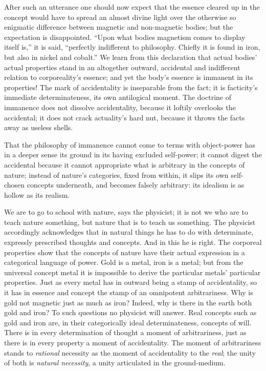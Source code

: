 \documentclass[12pt,a4paper]{book}
\begin{document}
After such an utterance one should now expect that the essence cleared up in the concept would have to spread an
almost divine light over the otherwise so enigmatic difference between magnetic and non-magnetic bodies; but the
expectation is disappointed. ``Upon what bodies magnetism comes to display itself is,'' it is said, ``perfectly
indifferent to philosophy. Chiefly it is found in iron, but also in nickel and cobalt.'' We learn from this
declaration that actual bodies' actual properties stand in an altogether outward, accidental and indifferent relation
to corporeality's essence; and yet the body's essence is immanent in its properties! The mark of accidentality is
inseparable from the fact; it is facticity's immediate determinateness, its own antilogical moment. The doctrine of
immanence does not dissolve accidentality, because it loftily overlooks the accidental; it does not crack
actuality's hard nut, because it throws the facts away as useless shells.

That the philosophy of immanence cannot come to terms with object-power has in a deeper sense its ground in its
having excluded self-power; it cannot digest the accidental because it cannot appropriate what is arbitrary in the
concepts of nature; instead of nature's categories, fixed from within, it slips its own self-chosen concepts
underneath, and becomes falsely arbitrary: its idealism is as hollow as its realism.

We are to go to school with nature, says the physicist; it is not we who are to teach nature something, but nature
that is to teach us something. The physicist accordingly acknowledges that in natural things he has to do with
determinate, expressly prescribed thoughts and concepts. And in this he is right. The corporeal properties show that
the concepts of nature
have their actual expression in a categorical language of power. Gold is a metal, iron is a metal; but from the
universal concept metal it is impossible to derive the particular metals' particular properties. Just as every metal
has in outward being a stamp of accidentality, so it has in essence and concept the stamp of an omnipotent
arbitrariness. Why is gold not magnetic just as much as iron? Indeed, why is there in the earth both gold and iron?
To such questions no physicist will answer. Real concepts such as gold and iron are, in their categorically ideal
determinateness, concepts of will. There is in every determination of thought a moment of arbitrariness, just as there
is in every property a moment of accidentality.
The moment of arbitrariness stands to \emph{rational} necessity as the moment of accidentality to the \emph{real};
the unity of both is \emph{natural necessity}, a unity articulated in the ground-medium.
\end{document}
